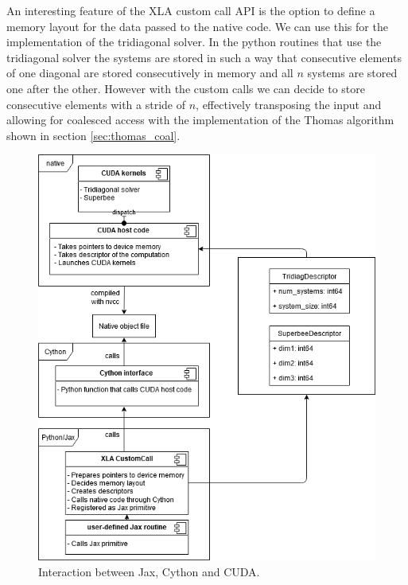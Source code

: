 \documentclass[a4paper,oneside]{memoir}
\begin{document}
An interesting feature of the XLA custom call API is the option to define a memory layout for the data passed to the native code. We can use this for the implementation of the tridiagonal solver. In the python routines that use the tridiagonal solver the systems are stored in such a way that consecutive elements of one diagonal are stored consecutively in memory and all $n$ systems are stored one after the other. However with the custom calls we can decide to store consecutive elements with a stride of $n$, effectively transposing the input and allowing for coalesced access with the implementation of the Thomas algorithm shown in section \ref{sec:thomas_coal}.

\begin{figure}[h]
    \centering
    \includegraphics[width=\textwidth]{integration.png}
    \caption{Interaction between Jax, Cython and CUDA.}
    \label{fig:integration}
\end{figure}






\end{document}
